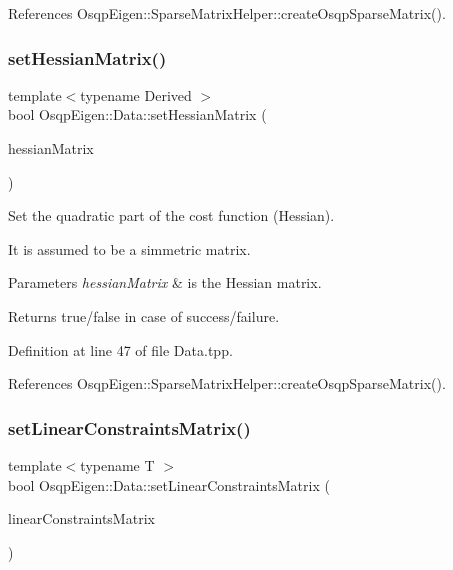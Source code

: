 References Osqp\+Eigen\+::\+Sparse\+Matrix\+Helper\+::create\+Osqp\+Sparse\+Matrix().

\mbox{\label{classOsqpEigen_1_1Data_a9daa8e7e8f02a77a2589323290be7e9a}} 
\subsubsection{\texorpdfstring{set\+Hessian\+Matrix()}{setHessianMatrix()}\hspace{0.1cm}{\footnotesize\ttfamily [2/2]}}
{\footnotesize\ttfamily template$<$typename Derived $>$ \\
bool Osqp\+Eigen\+::\+Data\+::set\+Hessian\+Matrix (\begin{DoxyParamCaption}\item[{const Eigen\+::\+Sparse\+Compressed\+Base$<$ Derived $>$ \&}]{hessian\+Matrix }\end{DoxyParamCaption})}



Set the quadratic part of the cost function (Hessian). 

It is assumed to be a simmetric matrix. 
\begin{DoxyParams}{Parameters}
{\em hessian\+Matrix} & is the Hessian matrix. \\
\hline
\end{DoxyParams}
\begin{DoxyReturn}{Returns}
true/false in case of success/failure. 
\end{DoxyReturn}


Definition at line 47 of file Data.\+tpp.



References Osqp\+Eigen\+::\+Sparse\+Matrix\+Helper\+::create\+Osqp\+Sparse\+Matrix().

\mbox{\label{classOsqpEigen_1_1Data_a202b1b554cad83590bf9999b1ffdf6c5}} 
\subsubsection{\texorpdfstring{set\+Linear\+Constraints\+Matrix()}{setLinearConstraintsMatrix()}\hspace{0.1cm}{\footnotesize\ttfamily [1/2]}}
{\footnotesize\ttfamily template$<$typename T $>$ \\
bool Osqp\+Eigen\+::\+Data\+::set\+Linear\+Constraints\+Matrix (\begin{DoxyParamCaption}\item[{const Eigen\+::\+Sparse\+Matrix$<$ T $>$ \&}]{linear\+Constraints\+Matrix }\end{DoxyParamCaption})}



